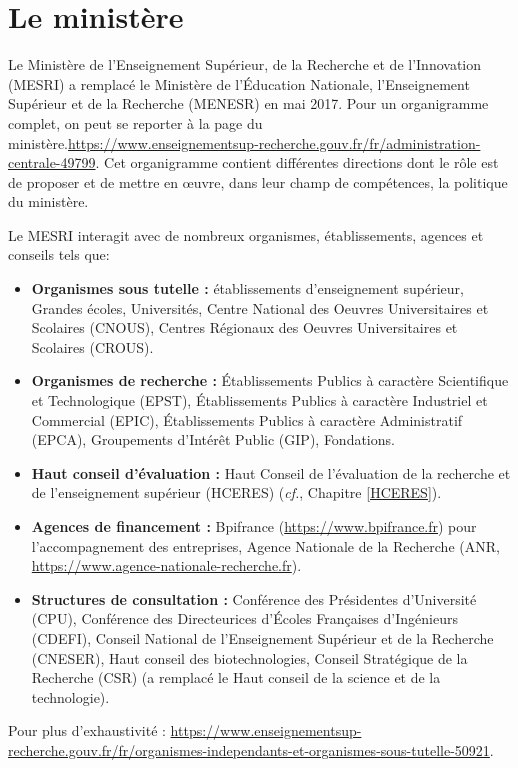 
\chapter{Le minist\`ere}
\label{chapMinistere}

Le Minist{\`e}re  de l'Enseignement Sup{\'e}rieur, de la Recherche et de l'Innovation (MESRI) a remplacé le Minist{\`e}re de l'\'Education Nationale,  l'Enseignement Sup{\'e}rieur et de la Recherche (MENESR) en mai 2017. Pour un organigramme complet, on peut se reporter \`a la page du minist\`ere.\url{https://www.enseignementsup-recherche.gouv.fr/fr/administration-centrale-49799}. Cet organigramme contient diff{\'e}rentes directions dont le r\^ole est de proposer et de mettre en \oe{}uvre, dans leur champ de comp\'etences, la politique du minist\`ere.

Le MESRI interagit avec de nombreux organismes, \'etablisse\-ments, agences et conseils tels que:
\begin{itemize}
 \item \textbf{Organismes sous tutelle :} \'etablissements d'enseignement sup{\'e}rieur, Grandes {\'e}coles, Universit{\'e}s,
 Centre National des Oeuvres Universitaires et Scolaires (CNOUS), Centres R{\'e}gionaux des Oeuvres Universitaires et Scolaires (CROUS).
 
 \item \textbf{Organismes de recherche :} \'Etablissements Publics {\`a} caract{\`e}re Scientifique et Technologique (EPST),
 \'Etablissements Publics {\`a} caract{\`e}re Industriel et Commercial (EPIC), \'Etablissements Publics {\`a} caract{\`e}re Administratif (EPCA),  Groupements d'Int{\'e}r{\^e}t Public (GIP), Fondations.
 
 \item \textbf{Haut conseil d'{\'e}valuation :} Haut Conseil de l'{\'e}valuation de la recherche et de l'enseignement sup{\'e}rieur (HCERES) ({\em cf.}, Chapitre \ref{HCERES}).
 
 \item \textbf{Agences de financement :} Bpifrance (\url{https://www.bpifrance.fr}) pour l'accompagnement des entreprises, Agence Nationale de la Recherche (ANR, \url{https://www.agence-nationale-recherche.fr}).

 \item \textbf{Structures de consultation :} Conf{\'e}rence des Pr{\'e}sident\mp e\mp s d'Universit{\'e} (CPU), 
 Conf{\'e}rence des Directeur\mp ice\mp s d'{\'E}coles Fran\c caises d'Ing{\'e}nieurs (CDEFI),
 Conseil National de l'Enseignement Sup{\'e}rieur et de la Recherche (CNESER), Haut conseil des biotechnologies, 
 Conseil Strat{\'e}gique de la Recherche (CSR) (a remplac{\'e} le Haut conseil de la science et de la technologie).
\end{itemize}
Pour plus d'exhaustivit\'e : \url{https://www.enseignementsup-recherche.gouv.fr/fr/organismes-independants-et-organismes-sous-tutelle-50921}.

